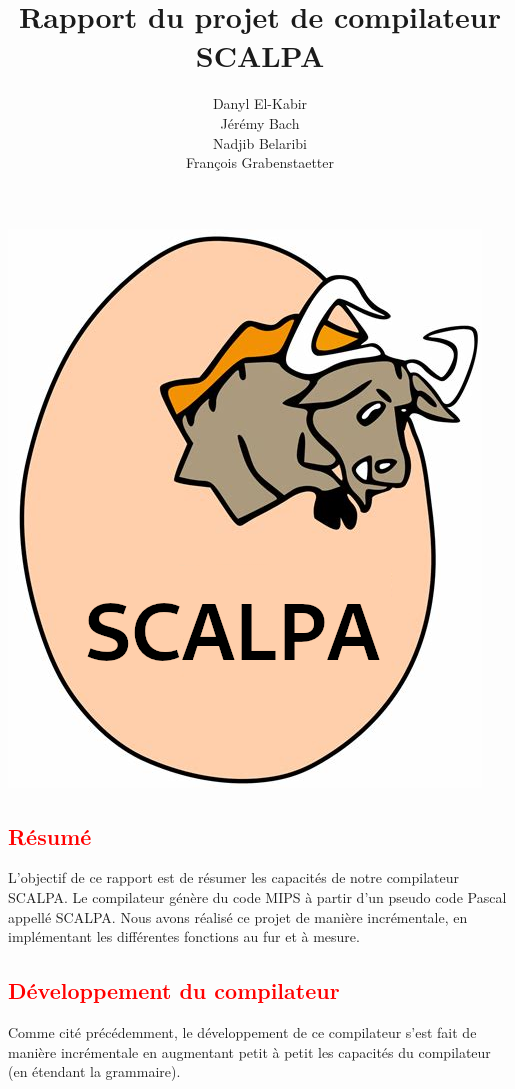 \documentclass[a4paper]{article}
\title{Rapport du projet de compilateur SCALPA}
\author{Danyl El-Kabir\\Jérémy Bach\\Nadjib Belaribi\\François Grabenstaetter}
\newcommand{\csection}[1]{\textcolor{red}{\section{#1}}}
\begin{document}
\sffamily
\everymath{\displaystyle}
\setlength\parindent{0mm}
\setlength{\parskip}{0.2cm}
\maketitle

\begin{center}
    \includegraphics[scale=0.8]{img/scalpa.png}
\end{center}

\newpage
\tableofcontents
\newpage

\csection{Résumé}

L'objectif de ce rapport est de résumer les capacités de notre compilateur SCALPA. Le compilateur génère du code MIPS à partir d'un pseudo code Pascal appellé SCALPA. Nous avons réalisé ce projet de manière incrémentale, en implémentant les différentes fonctions au fur et à mesure.

\csection{Développement du compilateur}

Comme cité précédemment, le développement de ce compilateur s'est fait de manière incrémentale en augmentant petit à petit les capacités du compilateur (en étendant la grammaire).
\end{document}
